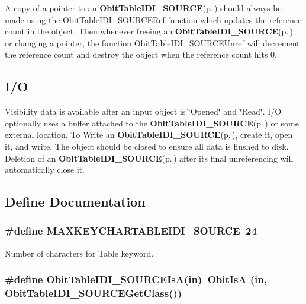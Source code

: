 A copy of a pointer to an {\bf Obit\-Table\-IDI\_\-SOURCE}{\rm (p.\,\pageref{structObitTableIDI__SOURCE})} should always be made using the Obit\-Table\-IDI\_\-SOURCERef function which updates the reference count in the object. Then whenever freeing an {\bf Obit\-Table\-IDI\_\-SOURCE}{\rm (p.\,\pageref{structObitTableIDI__SOURCE})} or changing a pointer, the function Obit\-Table\-IDI\_\-SOURCEUnref will decrement the reference count and destroy the object when the reference count hits 0.\subsection{I/O}\label{ObitTableIDI__SOURCE_8h_ObitTableIDI_SOURCEUsage}
Visibility data is available after an input object is \char`\"{}Opened\char`\"{} and \char`\"{}Read\char`\"{}. I/O optionally uses a buffer attached to the {\bf Obit\-Table\-IDI\_\-SOURCE}{\rm (p.\,\pageref{structObitTableIDI__SOURCE})} or some external location. To Write an {\bf Obit\-Table\-IDI\_\-SOURCE}{\rm (p.\,\pageref{structObitTableIDI__SOURCE})}, create it, open it, and write. The object should be closed to ensure all data is flushed to disk. Deletion of an {\bf Obit\-Table\-IDI\_\-SOURCE}{\rm (p.\,\pageref{structObitTableIDI__SOURCE})} after its final unreferencing will automatically close it.

\subsection{Define Documentation}
\subsubsection{\setlength{\rightskip}{0pt plus 5cm}\#define MAXKEYCHARTABLEIDI\_\-SOURCE\ 24}\label{ObitTableIDI__SOURCE_8h_a0}


Number of characters for Table keyword. 

\subsubsection{\setlength{\rightskip}{0pt plus 5cm}\#define Obit\-Table\-IDI\_\-SOURCEIs\-A(in)\ Obit\-Is\-A (in, Obit\-Table\-IDI\_\-SOURCEGet\-Class())}\label{ObitTableIDI__SOURCE_8h_a3}


